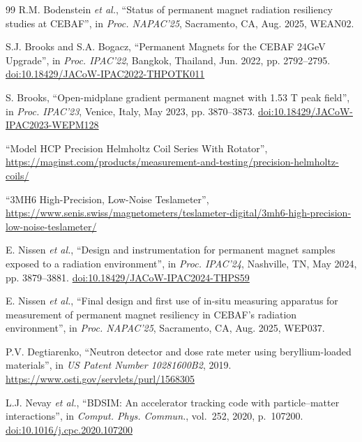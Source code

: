 \documentclass[a4paper,
               ]{jacow}
\begin{document}
{\begin{thebibliography}{99}
            R.M. Bodenstein \emph{et al.},
            ``Status of permanent magnet radiation resiliency studies at CEBAF'',
            in \emph{Proc. NAPAC'25}, Sacramento, CA, Aug. 2025, WEAN02.

           S.J. Brooks and S.A. Bogacz,
           ``Permanent Magnets for the CEBAF 24GeV Upgrade'',
           in \emph{Proc. IPAC'22}, Bangkok, Thailand, Jun. 2022, pp. 2792--2795.
           \url{doi:10.18429/JACoW-IPAC2022-THPOTK011}

            S. Brooks,
            ``Open-midplane gradient permanent magnet with 1.53 T peak field'',
            in \emph{Proc. IPAC'23}, Venice, Italy, May 2023, pp. 3870--3873.
            \url{doi:10.18429/JACoW-IPAC2023-WEPM128}

            ``Model HCP Precision Helmholtz Coil Series With Rotator'', \url{https://maginst.com/products/measurement-and-testing/precision-helmholtz-coils/}

            ``3MH6 High-Precision, Low-Noise Teslameter'', \url{https://www.senis.swiss/magnetometers/teslameter-digital/3mh6-high-precision-low-noise-teslameter/}

            E. Nissen \emph{et al.},
            ``Design and instrumentation for permanent magnet samples exposed to a radiation environment'',
            in \emph{Proc. IPAC'24}, Nashville, TN, May 2024, pp. 3879--3881.
            \url{doi:10.18429/JACoW-IPAC2024-THPS59}

            E. Nissen \emph{et al.},
            ``Final design and first use of in-situ measuring apparatus for measurement of permanent magnet resiliency in CEBAF's radiation environment'',
            in \emph{Proc. NAPAC'25}, Sacramento, CA, Aug. 2025, WEP037.

           P.V. Degtiarenko,
           ``Neutron detector and dose rate meter using beryllium-loaded materials'',
           in \emph{US Patent Number 10281600B2}, 2019.
           \url{https://www.osti.gov/servlets/purl/1568305}

            L.J. Nevay \emph{et al.},
            ``BDSIM: An accelerator tracking code with particle--matter interactions'',
            in \emph{Comput. Phys. Commun.}, vol.~252, 2020, p.~107200.
            \url{doi:10.1016/j.cpc.2020.107200}


\end{thebibliography}}
\end{document}
